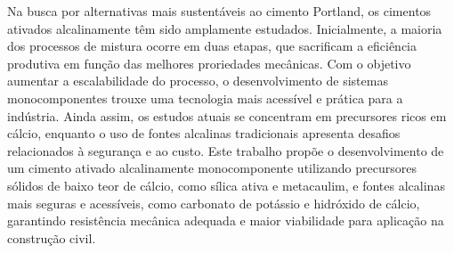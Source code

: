 Na busca por alternativas mais sustentáveis ao cimento Portland, os cimentos ativados alcalinamente têm sido amplamente estudados.
Inicialmente, a maioria dos processos de mistura ocorre em duas etapas, que sacrificam a eficiência produtiva em função das melhores proriedades mecânicas.
Com o objetivo  aumentar a escalabilidade do processo, o desenvolvimento de sistemas monocomponentes trouxe uma tecnologia mais acessível e prática para a indústria.
Ainda assim, os estudos atuais se concentram em precursores ricos em
cálcio, enquanto o uso de fontes alcalinas tradicionais apresenta desafios relacionados à segurança e ao custo.
Este trabalho propõe o desenvolvimento de um cimento ativado alcalinamente monocomponente utilizando precursores sólidos de baixo teor de cálcio, como sílica ativa e metacaulim, e fontes alcalinas mais seguras e acessíveis, como carbonato de potássio e hidróxido de cálcio, garantindo resistência mecânica adequada e maior viabilidade para aplicação na construção civil.